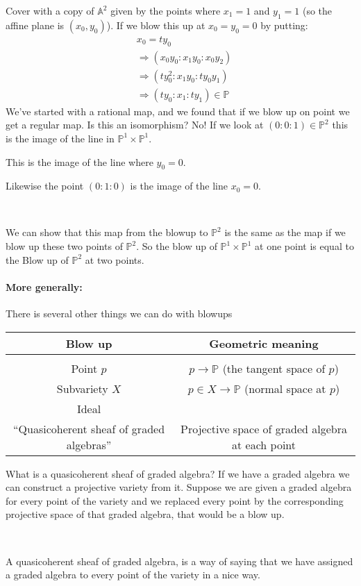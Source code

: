 Cover with a copy of $\mathbb{A}^2$ given by the points where $x_1 = 1$ and $y_1 = 1$ (so the affine plane is $(x_0,y_0)$). If we blow this up at $x_0 = y_0 = 0$ by putting:\begin{align*}
    &x_0 = ty_0\\
    &\Rightarrow (x_0y_0\colon x_1y_0\colon x_0y_2)\\
    &\Rightarrow (ty_0^2\colon x_1y_0\colon ty_0y_1)\\
    &\Rightarrow (ty_0\colon x_1\colon ty_1)\in \mathbb{P}
\end{align*}
We've started with a rational map, and we found that if we blow up on point we get a regular map. Is this an isomorphism? No! If we look at $(0\colon 0\colon 1)\in \mathbb{P}^2$ this is the image of the line in $\mathbb{P}^1\times \mathbb{P}^1$.

This is the image of the line where $y_0 = 0$.

Likewise the point $(0\colon 1\colon 0)$ is the image of the line $x_0 = 0$.

\

We can show that this map from the blowup to $\mathbb{P}^2$ is the same as the map if we blow up these two points of $\mathbb{P}^2$. So the blow up of $\mathbb{P}^1\times\mathbb{P}^1$ at one point is equal to the Blow up of $\mathbb{P}^2$ at two points.

\paragraph*{More generally:}
There is several other things we can do with blowups

\begin{center}
    \begin{tabular}{cc}
        Blow up & Geometric meaning\\
        \hline \\
        Point $p$ & $p\rightarrow \mathbb{P}$ (the tangent space of $p$)\\
        Subvariety $X$ & $p\in X\rightarrow \mathbb{P}$ (normal space at $p$)\\
        Ideal\\
        ``Quasicoherent sheaf of graded algebras'' & Projective space of graded algebra at each point
    \end{tabular}        
\end{center}
\begin{remark}
    What is a quasicoherent sheaf of graded algebra? If we have a graded algebra we can construct a projective variety from it. Suppose we are given a graded algebra for every point of the variety and we replaced every point by the corresponding projective space of that graded algebra, that would be a blow up.
    
    \

    A quasicoherent sheaf of graded algebra, is a way of saying that we have assigned a graded algebra to every point of the variety in a nice way.
\end{remark}

